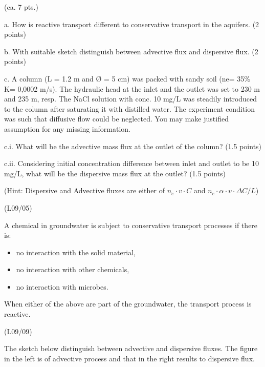 \documentclass[letterpaper,10pt,english]{sphinxmanual}
\let\sphinxpxdimen\pdfpxdimen\else\newdimen\sphinxpxdimen
\begin{document}
  (ca. 7 pts.)

a. How is reactive transport different to conservative transport in the aquifers. (2 points)

b. With suitable sketch distinguish between advective flux and dispersive flux. (2 points)

c. A column (L = 1.2 m and Ø = 5 cm) was packed with sandy soil (ne= 35\%  K= 0,0002 m/s). The hydraulic head at the inlet and the outlet was set to 230 m and 235 m, resp. The NaCl solution with conc. 10 mg/L was steadily introduced to the column after saturating it with distilled water. The experiment condition was such that diffusive flow could be neglected.  You may make justified assumption for any missing information.

c.i. What will be the advective mass flux at the outlet of the column? (1.5 points)

c.ii. Considering initial concentration difference between inlet and outlet to be 10 mg/L, what    will be the dispersive mass flux at the outlet? (1.5 points)

(Hint: Dispersive and Advective fluxes are either of \( n_e \cdot v\cdot C\) and \(n_e\cdot \alpha \cdot v \cdot \Delta C/L\))

 (L09/05)

A chemical in groundwater is subject to conservative transport processes if there is:
\begin{itemize}
\item {} 
no interaction with the solid material,

\item {} 
no interaction with other chemicals,

\item {} 
no interaction with microbes.

\end{itemize}

When either of the above are part of the groundwater, the transport process is reactive.

 (L09/09)

The sketch below distinguish between advective and dispersive fluxes. The figure in the left is of advective process and that in the right results to dispersive flux.

\noindent\sphinxincludegraphics[width=500\sphinxpxdimen]{{Q7b_2019-2020}.png}
\end{document}
